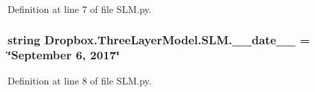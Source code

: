 Definition at line 7 of file S\+L\+M.\+py.

\hypertarget{namespaceDropbox_1_1ThreeLayerModel_1_1SLM_a265ec8e8243dbdb217159ead3dea2aba}{
\subsubsection[{\+\_\+\+\_\+date\+\_\+\+\_\+}]{\setlength{\rightskip}{0pt plus 5cm}string Dropbox.\+Three\+Layer\+Model.\+S\+L\+M.\+\_\+\+\_\+date\+\_\+\+\_\+ = \char`\"{}September 6, 2017\char`\"{}}}\label{namespaceDropbox_1_1ThreeLayerModel_1_1SLM_a265ec8e8243dbdb217159ead3dea2aba}


Definition at line 8 of file S\+L\+M.\+py.

